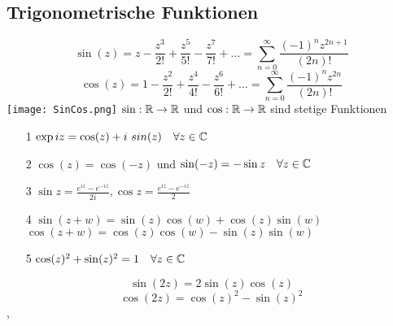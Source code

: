 \subsection{Trigonometrische Funktionen}
 \[ \sin(z) = z - \frac{z^3}{2!}+\frac{z^5}{5!}-\frac{z^7}{7!}+ \dots = \sum_{n=0}^{\infty} \frac{(-1)^nz^{2n+1}}{(2n)!}\]
\[ \cos(z) = 1-\frac{z^2}{2!}+\frac{z^4}{4!}-\frac{z^6}{6!}+\dots = \sum_{n=0}^{\infty} \frac{(-1)^nz^{2n}}{(2n)!}\]
\texttt{[image: SinCos.png]}
\Satz[3.41] \( \sin: \mathbb{R} \rightarrow \mathbb{R} \) und \(\cos: \mathbb{R} \rightarrow \mathbb{R} \) sind stetige Funktionen \newline
\Satz[3.42]
\begin{enumerate}
    \item [1] \( \exp iz = \cos(z) + i \ sin(z) \quad \forall z \in \mathbb{C} \)
    \item [2] \( \cos(z) = \cos(-z)\) und \newline \(\sin(-z) = -\sin z \quad \forall z \in \mathbb{C} \)
    \item [3] \( \sin z = \frac{e^{iz} - e^{-iz}}{2i}, \cos z = \frac{e^{iz} - e^{-iz}}{2}\)
    \item [4] \( \sin(z + w) = \sin(z) \cos(w) + \cos(z) \sin(w)\) \newline
    \( \cos(z + w) = \cos(z) \cos(w) - \sin(z) \sin(w) \)
    \item [5] \( \cos(z)^2 + \sin(z)^2 = 1 \quad \forall z \in \mathbb{C} \)
\end{enumerate}
\Korollar[3.34]
\[\sin(2z) = 2 \sin(z) \cos(z)\]
\[\cos(2z) = \cos(z)^2 - \sin(z)^2\]
\sep
